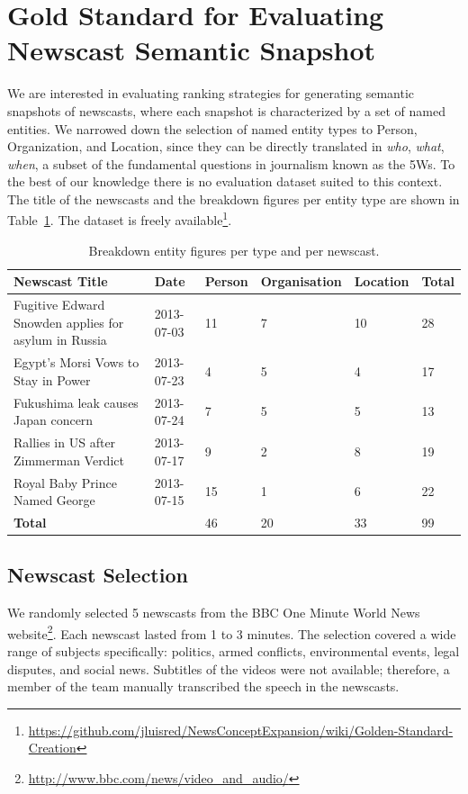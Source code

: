 \documentclass{llncs}
\begin{document}
\section{Gold Standard for Evaluating Newscast Semantic Snapshot}
\label{sec:GoldStandard}
We are interested in evaluating ranking strategies for generating semantic snapshots of newscasts, where each snapshot is characterized by a set of named entities. We narrowed down the selection of named entity types to Person, Organization, and Location, since they can be directly translated in \textit{who}, \textit{what}, \textit{when}, a subset of the fundamental questions in journalism known as the 5Ws. To the best of our knowledge there is no evaluation dataset suited to this context. The title of the newscasts and the breakdown figures per entity type are shown in Table~\ref{table:entitydistribution}. The dataset is freely available\footnote{\url{https://github.com/jluisred/NewsConceptExpansion/wiki/Golden-Standard-Creation}}.
 \begin{table}
  \resizebox{12cm}{!} {

\begin{tabular}{| p{6cm} | l| l| l| l| l|}
  \hline
  \textbf{Newscast Title} & \textbf{Date} & \textbf{Person} & \textbf{Organisation} &\textbf{Location} & \textbf{Total} \\
    \hline
  Fugitive Edward Snowden applies for asylum in Russia & 2013-07-03 & 11 & 7 & 10 & 28 \\
    \hline
 Egypt's Morsi Vows to Stay in Power & 2013-07-23 & 4 & 5 & 4 & 17 \\
    \hline
 Fukushima leak causes Japan concern & 2013-07-24 & 7 & 5 & 5 & 13\\
    \hline
 Rallies in US after Zimmerman Verdict & 2013-07-17 & 9 & 2 & 8 & 19 \\
    \hline
 Royal Baby Prince Named George & 2013-07-15& 15 & 1 & 6 & 22 \\
    \hline
    \textbf{Total}  &   & 46 & 20 & 33 & 99\\
  \hline
\end{tabular}
}
\caption[Table caption text]{Breakdown entity figures per type and per newscast.}
\label{table:entitydistribution}
\end{table}

\subsection{Newscast Selection}
We randomly selected 5 newscasts from the BBC One Minute World News website\footnote{\url{http://www.bbc.com/news/video_and_audio/}}. Each newscast lasted from 1 to 3 minutes. The selection covered a wide range of subjects specifically: politics, armed conflicts, environmental events, legal disputes, and social news. 
Subtitles of the videos were not available; therefore, a member of the team manually transcribed the speech in the newscasts.
\end{document}
